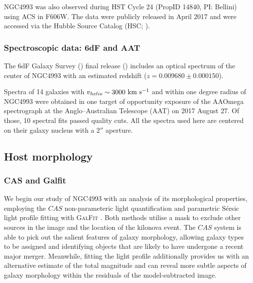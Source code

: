 NGC4993 was also observed during HST Cycle 24
(PropID 14840, PI: Bellini) using ACS in F606W. The data were publicly released in April 2017 and were accessed via the Hubble Source Catalog (HSC;  \citealt{whitemore}).

\subsubsection{Spectroscopic data: 6dF and AAT}

The 6dF Galaxy Survey (\citealt{6dfgs}) final release (\citealt{6df}) includes an optical spectrum of the center of NGC4993 with an estimated redshift ($z=0.009680 \pm 0.000150$). 

Spectra of 14 galaxies with $v_{helio}\sim3000~{\rm km}~{\rm s}^{-1}$ and within one degree radius of NGC4993 were obtained in one target of opportunity exposure of the AAOmega spectrograph at the Anglo--Australian Telescope (AAT) on 2017 August 27. Of those, 10 spectral fits passed quality cuts.
All the spectra used here are centered on their galaxy nucleus with a $2''$ aperture.



\subsection{Host morphology}\label{morphsec}

\subsubsection{CAS and Galfit}\label{paramfitting}

We begin our study of NGC4993 with an analysis of its morphological properties, employing the $CAS$ non-parameteric light quantification \citep{conselice} and parametric S\'ersic light profile fitting with \textsc{GalFit} \citep{Peng}. Both methods utilise a mask to exclude other sources in the image and the location of the kilonova event. The $CAS$ system is able to pick out the salient features of galaxy morphology, allowing galaxy types to be assigned and identifying objects that are likely to have undergone a recent major merger. Meanwhile, fitting the light profile additionally provides us with an alternative estimate of the total magnitude and can reveal more subtle aspects of galaxy morphology within the residuals of the model-subtracted image.

